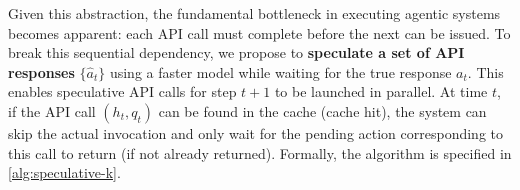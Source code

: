 Given this abstraction, the fundamental bottleneck in executing agentic systems becomes apparent: each API call must complete before the next can be issued. To break this sequential dependency, we propose to \textbf{speculate a set of API responses} $\{\hat{a}_{t}\}$ using a faster model while waiting for the true response $a_{t}$. This enables speculative API calls for step $t+1$ to be launched in parallel. At time $t$, if the API call $(h_t, q_t)$ can be found in the cache (cache hit), the system can skip the actual invocation and only wait for the pending action corresponding to this call to return (if not already returned). Formally, the algorithm is specified in \cref{alg:speculative-k}. 





